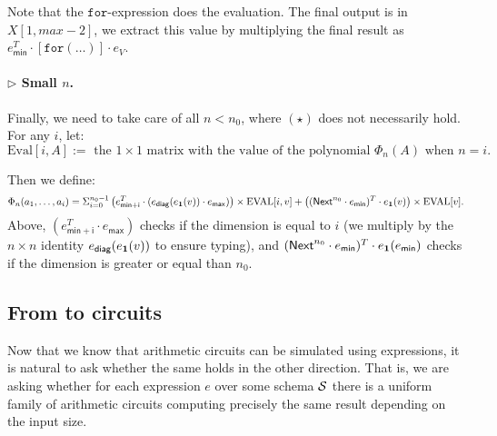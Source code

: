     Note that the $ \texttt{for}$-expression does the evaluation. The final output is in $X[1,max-2]$, we extract this value by multiplying the final result as $e_{\mathsf{min}}^T\cdot [\texttt{for}(\ldots )]\cdot e_{V}$.

\paragraph{$\rhd$  Small $n$.}

    Finally, we need to take care of all $n<n_0$, where $(\star)$ does not necessarily hold. For any $i$, let: $$\text{Eval}[i,A]:= \text{ the } 1\times 1 \text{ matrix with the value of the polynomial } \Phi_n(A) \text{ when } n=i.$$

    Then we define: 
    $$
    \Phi_n(a_1,\ldots, a_i)=\Sigma_{i=0}^{n_0-1}\left( e_{\mathsf{min}+\mathsf{i}}^T\cdot (e_{\mathsf{diag}}(e_{\mathbf{1}}(v))\cdot e_{\mathsf{max}}) \right) \times \text{EVAL}[i,v] + \left( (\mathsf{Next}^{n_0}\cdot e_{\mathsf{min}})^T\cdot e_{\mathbf{1}} (v) \right)\times \text{EVAL}[v].
    $$ 
    Above, $(e_{\mathsf{min}+\mathsf{i}}^T\cdot e_{\mathsf{max}})$ checks if the dimension is equal to $i$ (we multiply
    by the $n\times n$ identity $e_{\mathsf{diag}}(e_{\mathbf{1}}(v))$ to ensure typing), 
    and $(\mathsf{Next}^{n_0}\cdot e_{\mathsf{min}})^T\cdot e_{\mathbf{1}} (e_{\mathsf{min}})$ checks if the 
    dimension is greater or equal than $n_0$.



\subsection{From \langfor to circuits}\label{subsec:formatlangtoac}

Now that we know that arithmetic circuits can be simulated using \langfor expressions, it is natural to ask whether the same holds in the other direction. That is, we are asking whether for each \langfor expression $e$ over some schema $\mathcal{S}$ there is a uniform family of arithmetic circuits computing precisely the same result depending on the input size. 

